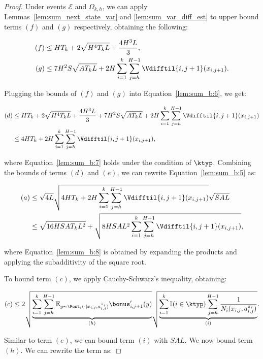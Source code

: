 \begin{proof}
Under events $\mathcal{E}$ and $\Omega_{k,h}$, we can apply Lemmas~\ref{lem:sum_next_state_var} and \ref{lem:sum_var_diff_est} to upper bound terms $(f)$ and $(g)$ respectively, obtaining the following:

\begin{align*}
    (f) &\le HT_k + 2 \sqrt{H^4 T_k L} + \frac{4 H^3 L}{3}, \\
    (g) &\le 7 H^2 S \sqrt{A T_k L} + 2 H \sum_{i=1}^k \sum_{j=h}^{H-1} \Vdifftil{i,j+1}(x_{i,j+1}).
\end{align*}

Plugging the bounds of $(f)$ and $(g)$ into Equation~\eqref{lem:sum_b:6}, we get:

\begin{align}
    (d) &\le HT_k + 2 \sqrt{H^4 T_k L} + \frac{4 H^3 L}{3} + 7 H^2 S \sqrt{A T_k L} + 2 H \sum_{i=1}^k \sum_{j=h}^{H-1} \Vdifftil{i,j+1}(x_{i,j+1}) \nonumber \\
    &\le 4 H T_k + 2 H \sum_{i=1}^k \sum_{j=h}^{H-1} \Vdifftil{i,j+1}(x_{i,j+1}), \label{lem:sum_b:7}
\end{align}

where Equation~\eqref{lem:sum_b:7} holds under the condition of $\ktyp$.
Combining the bounds of terms $(d)$ and $(e)$, we can rewrite Equation~\eqref{lem:sum_b:5} as:

\begin{align}
    (a) &\le \sqrt{4L} \sqrt{4 H T_k + 2 H \sum_{i=1}^k \sum_{j=h}^{H-1} \Vdifftil{i,j+1}(x_{i,j+1})} \sqrt{SAL} \nonumber \\
    &\le \sqrt{16 H S A T_k L^2} + \sqrt{8 HSAL^2 \sum_{i=1}^k \sum_{j=h}^{H-1} \Vdifftil{i,j+1}(x_{i,j+1})}, \label{lem:sum_b:8}
\end{align}

where Equation~\eqref{lem:sum_b:8} is obtained by expanding the products and applying the subadditivity of the square root.

To bound term $(c)$, we apply Cauchy-Schwarz's inequality, obtaining:

\begin{equation}
\label{lem:sum_b:9}
    (c) \le 2 \sqrt{\underbrace{\sum_{i=1}^k \sum_{j=h}^{H-1} \mathbb{E}_{y \sim \Pest_i(\cdot|x_{i,j},a_{i,j}^{\pi_i})} \bonus'_{i,j+1}(y)}_{(h)}} \sqrt{\underbrace{\sum_{i=1}^k \mathbb{I}(i \in \ktyp) \sum_{j=h}^{H-1} \frac{1}{N_i (x_{i,j}, a_{i,j}^{\pi_i})}}_{(i)}}.
\end{equation}

Similar to term $(e)$, we can bound term $(i)$ with $SAL$.
We now bound term $(h)$. We can rewrite the term as:


\end{proof}
